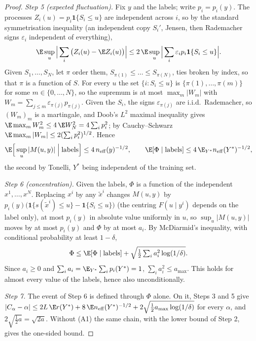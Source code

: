 \begin{proof}
\emph{Step 5 (expected fluctuation).} Fix $y$ and the labels; write $p_i=p_i(y)$. The
processes $Z_i(u)=p_i\mathbf 1\{S_i\le u\}$ are independent across $i$, so by the standard
symmetrisation inequality (an independent copy $S_i'$, Jensen, then Rademacher signs
$\varepsilon_i$ independent of everything),
\[
\E\sup_u\Big|\sum_i\big(Z_i(u)-\E Z_i(u)\big)\Big|\le2\,\E\sup_u\Big|\sum_i\varepsilon_ip_i\mathbf 1\{S_i\le u\}\Big| .
\]
Given $S_1,\dots,S_N$, let $\pi$ order them, $S_{\pi(1)}\le\dots\le S_{\pi(N)}$, ties broken by
index, so that $\pi$ is a function of $S$. For every $u$ the set $\{i:S_i\le u\}$ is
$\{\pi(1),\dots,\pi(m)\}$ for some $m\in\{0,\dots,N\}$, so the supremum is at most
$\max_m|W_m|$ with $W_m=\sum_{j\le m}\varepsilon_{\pi(j)}p_{\pi(j)}$. Given the $S_i$, the signs
$\varepsilon_{\pi(j)}$ are i.i.d.\ Rademacher, so $(W_m)_m$ is a martingale, and Doob's $L^2$
maximal inequality gives $\E\max_m W_m^2\le4\,\E W_N^2=4\sum_ip_i^2$; by Cauchy--Schwarz
$\E\max_m|W_m|\le2(\sum_ip_i^2)^{1/2}$. Hence
\[
\E\Big[\sup_u|M(u,y)|\;\Big|\;\text{labels}\Big]\le4\,n_{\mathrm{eff}}(y)^{-1/2},
\qquad
\E[\Phi\mid\text{labels}]\le4\,\E_{Y^*}n_{\mathrm{eff}}(Y^*)^{-1/2},
\]
the second by Tonelli, $Y^*$ being independent of the training set.

\emph{Step 6 (concentration).} Given the labels, $\Phi$ is a function of the independent
$x^1,\dots,x^N$. Replacing $x^i$ by any $\tilde x^i$ changes $M(u,y)$ by
$p_i(y)\big(\mathbf 1\{s(\tilde x^i)\le u\}-\mathbf 1\{S_i\le u\}\big)$ (the centring
$F(u\mid y^i)$ depends on the label only), at most $p_i(y)$ in absolute value uniformly in $u$,
so $\sup_u|M(u,y)|$ moves by at most $p_i(y)$ and $\Phi$ by at most $a_i$. By McDiarmid's
inequality, with conditional probability at least $1-\delta$,
\[
\Phi\le\E[\Phi\mid\text{labels}]+\sqrt{\tfrac12\textstyle\sum_ia_i^2\log(1/\delta)} .
\]
Since $a_i\ge0$ and $\sum_ia_i=\E_{Y^*}\sum_ip_i(Y^*)=1$, $\sum_ia_i^2\le a_{\max}$. This holds
for almost every value of the labels, hence also unconditionally.

\emph{Step 7.} The event of Step 6 is defined through $\Phi$ alone. On it, Steps 3 and 5 give
$|C_\alpha-\alpha|\le2L\,\E r(Y^*)+8\,\E n_{\mathrm{eff}}(Y^*)^{-1/2}+2\sqrt{\tfrac12a_{\max}\log(1/\delta)}$
for every $\alpha$, and $2\sqrt{\frac12a}=\sqrt{2a}$. Without (A1) the same chain, with the
lower bound of Step 2, gives the one-sided bound.
\end{proof}

